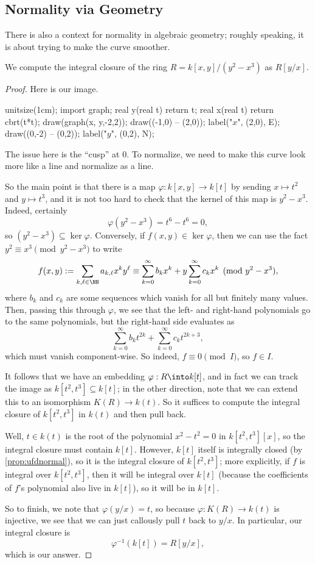 \subsection{Normality via Geometry}
There is also a context for normality in algebraic geometry; roughly speaking, it is about trying to make the curve smoother.
\begin{exe}
	We compute the integral closure of the ring $R=k[x,y]/\left(y^2-x^3\right)$ as $R[y/x]$.
\end{exe}
\begin{proof}
	Here is our image.
	\begin{center}
		\begin{asy}
			unitsize(1cm);
			import graph;
			real y(real t)
			{
				return t;
			}
			real x(real t)
			{
				return cbrt(t*t);
			}
			draw(graph(x, y,-2,2));
			draw((-1,0) -- (2,0)); label("$x$", (2,0), E);
			draw((0,-2) -- (0,2)); label("$y$", (0,2), N);
		\end{asy}
	\end{center}
	The issue here is the ``cusp'' at $0$. To normalize, we need to make this curve look more like a line and normalize as a line.

	So the main point is that there is a map $\varphi:k[x,y]\to k[t]$ by sending $x\mapsto t^2$ and $y\mapsto t^3$, and it is not too hard to check that the kernel of this map is $y^2-x^3$. Indeed, certainly
	\[\varphi\left(y^2-x^3\right)=t^6-t^6=0,\]
	so $\left(y^2-x^3\right)\subseteq\ker\varphi$. Conversely, if $f(x,y)\in\ker\varphi$, then we can use the fact $y^2\equiv x^3\pmod{y^2-x^3}$ to write
	\[f(x,y):=\sum_{k,\ell\in\NN}a_{k,\ell}x^ky^\ell\equiv\sum_{k=0}^\infty b_kx^k+y\sum_{k=0}^\infty c_kx^k\pmod{y^2-x^3},\]
	where $b_k$ and $c_k$ are some sequences which vanish for all but finitely many values. Then, passing this through $\varphi$, we see that the left- and right-hand polynomials go to the same polynomials, but the right-hand side evaluates as
	\[\sum_{k=0}^\infty b_kt^{2k}+\sum_{k=0}^\infty c_kt^{2k+3},\]
	which must vanish component-wise. So indeed, $f\equiv0\pmod I$, so $f\in I$.

	It follows that we have an embedding $\varphi:R\into k[t]$, and in fact we can track the image as $k\left[t^2,t^3\right]\subseteq k[t]$; in the other direction, note that we can extend this to an isomorphism $K(R)\to k(t)$. So it suffices to compute the integral closure of $k\left[t^2,t^3\right]$ in $k(t)$ and then pull back.

	Well, $t\in k(t)$ is the root of the polynomial $x^2-t^2=0$ in $k\left[t^2,t^3\right][x]$, so the integral closure must contain $k[t]$. However, $k[t]$ itself is integrally closed (by \autoref{prop:ufdnormal}), so it is the integral closure of $k\left[t^2,t^3\right]$; more explicitly, if $f$ is integral over $k\left[t^2,t^3\right]$, then it will be integral over $k[t]$ (because the coefficients of $f$'s polynomial also live in $k[t]$), so it will be in $k[t]$.

	So to finish, we note that $\varphi(y/x)=t$, so because $\varphi:K(R)\to k(t)$ is injective, we see that we can just callously pull $t$ back to $y/x$. In particular, our integral closure is
	\[\varphi^{-1}(k[t])=\boxed{R[y/x]},\]
	which is our answer.
\end{proof}
